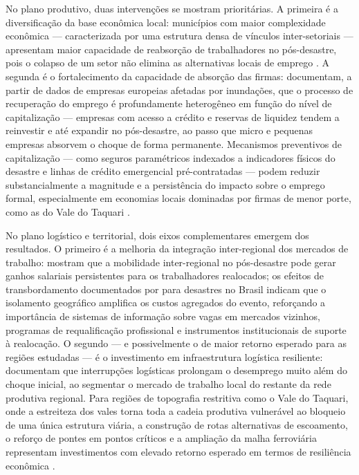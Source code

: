 \documentclass[a4paper,12pt]{article}
\begin{document}
No plano produtivo, duas intervenções se mostram prioritárias. A primeira é a
diversificação da base econômica local: municípios com maior complexidade econômica
--- caracterizada por uma estrutura densa de vínculos inter-setoriais --- apresentam
maior capacidade de reabsorção de trabalhadores no pós-desastre, pois o colapso de
um setor não elimina as alternativas locais de emprego \cite{oclery2024}. A segunda
é o fortalecimento da capacidade de absorção das firmas: 
documentam, a partir de dados de empresas europeias afetadas por inundações, que o
processo de recuperação do emprego é profundamente heterogêneo em função do nível de
capitalização --- empresas com acesso a crédito e reservas de liquidez tendem a
reinvestir e até expandir no pós-desastre, ao passo que micro e pequenas empresas
absorvem o choque de forma permanente. Mecanismos preventivos de capitalização ---
como seguros paramétricos indexados a indicadores físicos do desastre e linhas de
crédito emergencial pré-contratadas --- podem reduzir substancialmente a magnitude e
a persistência do impacto sobre o emprego formal, especialmente em economias locais
dominadas por firmas de menor porte, como as do Vale do Taquari
\cite{fatica2022, deryugina2017}.

No plano logístico e territorial, dois eixos complementares emergem dos resultados.
O primeiro é a melhoria da integração inter-regional dos mercados de trabalho:
 mostram que a mobilidade inter-regional no pós-desastre
pode gerar ganhos salariais persistentes para os trabalhadores realocados; os efeitos
de transbordamento documentados por  para desastres no Brasil
indicam que o isolamento geográfico amplifica os custos agregados do evento,
reforçando a importância de sistemas de informação sobre vagas em mercados vizinhos,
programas de requalificação profissional e instrumentos institucionais de suporte à
realocação. O segundo --- e possivelmente o de maior retorno esperado para as regiões
estudadas --- é o investimento em infraestrutura logística resiliente:
 documentam que interrupções logísticas prolongam o desemprego
muito além do choque inicial, ao segmentar o mercado de trabalho local do restante da
rede produtiva regional. Para regiões de topografia restritiva como o Vale do
Taquari, onde a estreiteza dos vales torna toda a cadeia produtiva vulnerável ao
bloqueio de uma única estrutura viária, a construção de rotas alternativas de
escoamento, o reforço de pontes em pontos críticos e a ampliação da malha ferroviária
representam investimentos com elevado retorno esperado em termos de resiliência
econômica \cite{kousky2014, hallegatte2019}.
\end{document}
